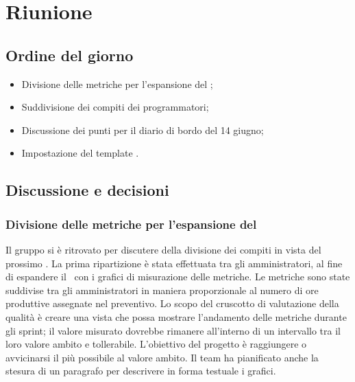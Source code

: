 \section{Riunione}
\subsection{Ordine del giorno}
\begin{itemize}
	\item Divisione delle metriche per l'espansione del \PdQ;
	\item Suddivisione dei compiti dei programmatori;
	\item Discussione dei punti per il diario di bordo del 14 giugno;
	\item Impostazione del template .
\end{itemize}

\subsection{Discussione e decisioni}
\subsubsection{Divisione delle metriche per l'espansione del \PdQ}
\par Il gruppo si è ritrovato per discutere della divisione dei compiti in vista del prossimo . 
La prima ripartizione è stata effettuata tra gli amministratori, al fine di espandere il \PdQ\ con i grafici di misurazione delle metriche. 
Le metriche sono state suddivise tra gli amministratori in maniera proporzionale al numero di ore produttive assegnate nel preventivo. Lo scopo del cruscotto di valutazione della qualità è creare una vista che possa mostrare l'andamento delle metriche durante gli sprint; il valore misurato dovrebbe rimanere all'interno di un intervallo tra il loro valore ambito e tollerabile. 
L'obiettivo del progetto è raggiungere o avvicinarsi il più possibile al valore ambito.
Il team ha pianificato anche la stesura di un paragrafo per descrivere in forma testuale i grafici.

